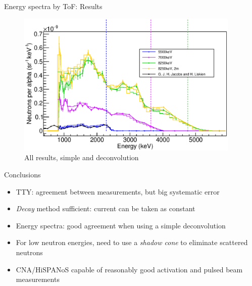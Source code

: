 \documentclass[11pt]{beamer}
\begin{document}
\begin{frame}{Energy spectra by ToF: Results}
	\begin{figure}[H]
		\centering
		\includegraphics[width=0.95\textwidth]{pulsed_results.eps}
		\caption{All results, simple and deconvolution}
		\label{}
	\end{figure}
\end{frame}

\begin{frame}{Conclusions}
	\begin{itemize}
		\item TTY: agreement between measurements, but big systematic error
		\item \textit{Decay} method sufficient: current can be taken as constant
		\item Energy spectra: good agreement when using a simple deconvolution
		\item For low neutron energies, need to use a \textit{shadow cone} to eliminate scattered neutrons
		\item CNA/HiSPANoS capable of reasonably good activation and pulsed beam measurements
	\end{itemize}
\end{frame}
\end{document}
